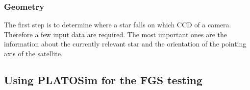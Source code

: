 \subsubsection{Geometry}
The first step is to determine where a star falls on which CCD of a camera. Therefore a few input data are required. The most important ones are the information about the currently relevant star and the orientation of the pointing axis of the satellite.

\subsection{Using PLATOSim for the FGS testing} 